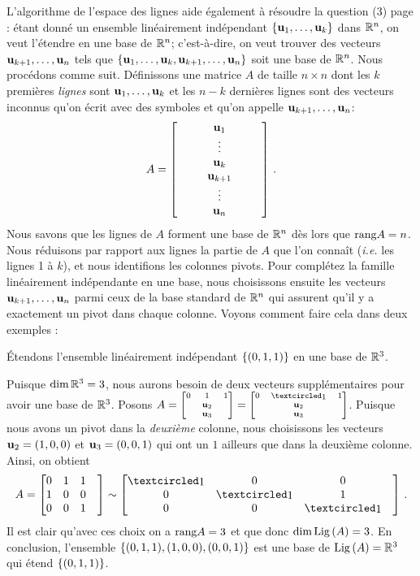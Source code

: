 L'algorithme de l'espace des lignes aide également à résoudre la question (3) page \pageref{FindingBases}: \'etant donné un ensemble linéairement indépendant $\{\mathbf{u}_1,\dots, \mathbf{u}_k \}$ dans $\mathbb{R}^n$, on veut l'étendre en une base de $\mathbb{R}^n$; c'est-à-dire, on veut trouver des vecteurs $\mathbf{u}_{k+1}, \dots, \mathbf{u}_n$ tels que $\{\mathbf{u}_1, \dots ,\mathbf{u}_k, \mathbf{u}_{k+1}, \dots, \mathbf{u}_n \}$ soit une base de $\mathbb{R}^n$. Nous procédons comme suit. Définissons une matrice $A$ de taille $n \times n$ dont les $k$ premières {\it lignes} sont $\mathbf{u}_1,\dots, \mathbf{u}_k $ et les $n-k$ dernières lignes sont des vecteurs inconnus qu'on écrit avec des symboles et qu'on appelle $\mathbf{u}_{k+1}, \dots, \mathbf{u}_n $:
$$A=\left[ \begin{matrix} ~&~&\mathbf{u}_1&~&~\\ &&\vdots \\ &&\mathbf{u}_k \\&&\mathbf{u}_{k+1} \\ &&\vdots \\ &&\mathbf{u}_n \end{matrix} \right]\,.$$ 
Nous savons que les lignes de $A$ forment une base de $\mathbb{R}^n$ dès lors que $\textrm{rang} A=n$. Nous réduisons par rapport aux lignes la partie de $A$ que l'on connaît (\textit{i.e.} les lignes 1 à $k$), et nous identifions les colonnes pivots. Pour compl\'etez la famille linéairement indépendante en une base, nous choisissons ensuite les vecteurs $\mathbf{u}_{k+1}, \dots, \mathbf{u}_n$ parmi ceux de la base standard de $\mathbb{R}^n$ qui assurent qu'il y a exactement un pivot dans chaque colonne. Voyons comment faire cela dans deux exemples :

\begin{myexample} Étendons l'ensemble linéairement indépendant $\{(0,1,1)\}$ en une base de $\mathbb{R}^3$. 

Puisque $\dim \mathbb{R}^3=3$, nous aurons besoin de deux vecteurs supplémentaires pour avoir une base de $\mathbb{R}^3$. Posons $A=\scriptsize\mat{0&1&1\\&\uu_2&\\&\uu_3&}=\mat{0&\pivot&1\\&\uu_2&\\&\uu_3&}$. Puisque nous avons un pivot dans la \emph{deuxi\`eme} colonne, nous choisissons les vecteurs $\mathbf{u}_2=(1,0,0)$ et $\mathbf{u}_3=(0,0,1)$ qui ont un $1$ ailleurs que dans la deuxième colonne. Ainsi, on obtient
$$A=\mat{0&1&1\\1&0&0\\0&0&1&}\sim \mat{\pivot&0&0\\0&\pivot&1\\0&0&\pivot&}\,. $$ Il est clair qu'avec ces choix on a $\textrm{rang} A=3$ et que donc $\dim \operatorname{Lig\,}(A)=3$. En conclusion, l'ensemble $\{(0,1,1),(1,0,0),(0,0,1) \}$ est une base de $\operatorname{Lig\,}(A)=\mathbb{R}^3$ qui \'etend $\{(0,1,1)\}$.
\end{myexample}

